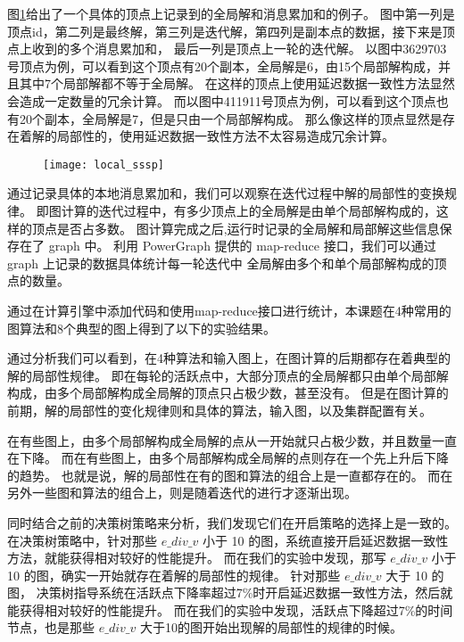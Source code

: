 图\ref{fig:local_sssp}给出了一个具体的顶点上记录到的全局解和消息累加和的例子。
图中第一列是顶点id，第二列是最终解，第三列是迭代解，第四列是副本点的数据，接下来是顶点上收到的多个消息累加和，
最后一列是顶点上一轮的迭代解。
以图中3629703号顶点为例，可以看到这个顶点有20个副本，全局解是6，由15个局部解构成，并且其中7个局部解都不等于全局解。
在这样的顶点上使用延迟数据一致性方法显然会造成一定数量的冗余计算。
而以图中411911号顶点为例，可以看到这个顶点也有20个副本，全局解是7，但是只由一个局部解构成。
那么像这样的顶点显然是存在着解的局部性的，使用延迟数据一致性方法不太容易造成冗余计算。


\begin{figure}[!htbp]
  \centering
  \texttt{[image: local\_sssp]}
  \label{fig:local_sssp}
\end{figure}
通过记录具体的本地消息累加和，我们可以观察在迭代过程中解的局部性的变换规律。
即图计算的迭代过程中，有多少顶点上的全局解是由单个局部解构成的，这样的顶点是否占多数。
图计算完成之后,运行时记录的全局解和局部解这些信息保存在了 graph 中。 
利用 PowerGraph 提供的 map-reduce 接口，我们可以通过 graph 上记录的数据具体统计每一轮迭代中
全局解由多个和单个局部解构成的顶点的数量。


通过在计算引擎中添加代码和使用map-reduce接口进行统计，本课题在4种常用的图算法和8个典型的图上得到了以下的实验结果。

通过分析我们可以看到，在4种算法和输入图上，在图计算的后期都存在着典型的解的局部性规律。
即在每轮的活跃点中，大部分顶点的全局解都只由单个局部解构成，由多个局部解构成全局解的顶点只占极少数，甚至没有。
但是在图计算的前期，解的局部性的变化规律则和具体的算法，输入图，以及集群配置有关。


在有些图上，由多个局部解构成全局解的点从一开始就只占极少数，并且数量一直在下降。
而在有些图上，由多个局部解构成全局解的点则存在一个先上升后下降的趋势。
也就是说，解的局部性在有的图和算法的组合上是一直都存在的。
而在另外一些图和算法的组合上，则是随着迭代的进行才逐渐出现。

同时结合之前的决策树策略来分析，我们发现它们在开启策略的选择上是一致的。
在决策树策略中，针对那些 $e\_div\_v$ 小于 10 的图，系统直接开启延迟数据一致性方法，就能获得相对较好的性能提升。
而在我们的实验中发现，那写 $e\_div\_v$ 小于 10 的图，确实一开始就存在着解的局部性的规律。
针对那些 $e\_div\_v$ 大于 10 的图， 决策树指导系统在活跃点下降率超过7\%时开启延迟数据一致性方法，然后就能获得相对较好的性能提升。
而在我们的实验中发现，活跃点下降超过7\%的时间节点，也是那些 $e\_div\_v$ 大于10的图开始出现解的局部性的规律的时候。

